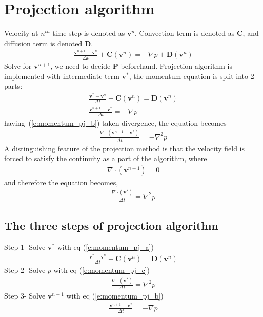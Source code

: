 \documentclass[11pt,dvips]{article}
\numberwithin{equation}{section}
\begin{document}
\section{Projection algorithm}
Velocity at $n^{th}$ time-step is denoted as $\mathbf{v}^n$. Convection term is 
denoted as $\mathbf{C}$, and diffusion term is denoted $\mathbf{D}$.
%
\begin{align}
\frac{\mathbf{v}^{n+1}-\mathbf{v}^{n}}{\Delta t}+\mathbf{C}(\mathbf{v}^{n})=
-\nabla p+\mathbf{D}(\mathbf{v}^{{n}}) \label{e:momentum_pj} 
\end{align}
%
Solve for $\mathbf{v}^{n+1}$, we need to decide $\mathbf{P}$ beforehand. Projection 
algorithm is implemented with intermediate term $\mathbf{v}^{*}$, the momentum 
equation is split into 2 parts: 
%
\begin{gather}
\frac{\mathbf{v}^{*}-\mathbf{v}^{n}}{\Delta t}+\mathbf{C}(\mathbf{v}^{n})=
\mathbf{D}(\mathbf{v}^{{n}})  \label{e:momentum_pj_a}  \\
\frac{\mathbf{v}^{n+1}-\mathbf{v}^{*}}{\Delta t}=-\nabla p \label{e:momentum_pj_b}
\end{gather}
%
having~(\ref{e:momentum_pj_b}) taken divergence, the equation becomes
%
\begin{align}
\frac{\nabla \cdot(\mathbf{v}^{n+1}-\mathbf{v}^{*})}{\Delta t}=-\nabla ^2 p
\label{e:div_momentum_pj_b}
\end{align}
%
A distinguishing feature of the projection method is that the velocity field is 
forced to satisfy the continuity as a part of the algorithm, where
%
\begin{align}
\nabla \cdot(\mathbf{v}^{n+1})=0 \label{e:continuity_pj}
\end{align}
%
and therefore  the equation becomes, 
%
\begin{align}
\frac{\nabla \cdot(\mathbf{v}^{*})}{\Delta t}=\nabla ^2 p \label{e:momentum_pj_c}
\end{align}
%
\subsection{The three steps of projection algorithm}
Step 1- Solve $\mathbf{v}^{*}$ with eq (\ref{e:momentum_pj_a})
%
\begin{align}
\frac{\mathbf{v}^{*}-\mathbf{v}^{n}}{\Delta t}+\mathbf{C}(\mathbf{v}^{n})=
\mathbf{D}(\mathbf{v}^{{n}})  \nonumber
\end{align}
%
Step 2- Solve $p$ with eq (\ref{e:momentum_pj_c})
%
\begin{align}
\frac{\nabla \cdot(\mathbf{v}^{*})}{\Delta t}=\nabla ^2 p \nonumber
\end{align}
%
Step 3- Solve $\mathbf{v}^{n+1}$  with eq (\ref{e:momentum_pj_b})
%
\begin{align}
\frac{\mathbf{v}^{n+1}-\mathbf{v}^{*}}{\Delta t}=-\nabla p \nonumber
\end{align}
%
\end{document}
